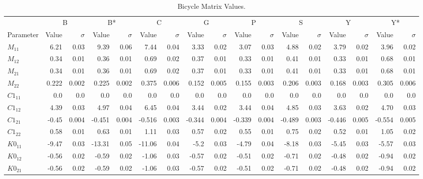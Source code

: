 \documentclass[../report/parameterReport.tex]{subfiles}
\begin{document}
\begin{landscape}
\begin{table}[tb]
\begin{center}
\caption{Bicycle Matrix Values.}
{\small
\begin{tabular}{l|rr|rr|rr|rr|rr|rr|rr|rr}
 & \multicolumn{2}{c}{B} & \multicolumn{2}{c}{B*} & \multicolumn{2}{c}{C} & \multicolumn{2}{c}{G} & \multicolumn{2}{c}{P} & \multicolumn{2}{c}{S} & \multicolumn{2}{c}{Y} & \multicolumn{2}{c}{Y*}\\
Parameter & Value & $\sigma$ & Value & $\sigma$
          & Value & $\sigma$ & Value & $\sigma$
          & Value & $\sigma$ & Value & $\sigma$
          & Value & $\sigma$ & Value & $\sigma$\\
\hline
$M_{11}$ & 6.21 & 0.03 & 9.39 & 0.06 & 7.44 & 0.04 & 3.33 & 0.02 & 3.07 & 0.03 & 4.88 & 0.02 & 3.79 & 0.02 & 3.96 & 0.02\\
$M_{12}$ & 0.34 & 0.01 & 0.36 & 0.01 & 0.69 & 0.02 & 0.37 & 0.01 & 0.33 & 0.01 & 0.41 & 0.01 & 0.33 & 0.01 & 0.68 & 0.01\\
$M_{21}$ & 0.34 & 0.01 & 0.36 & 0.01 & 0.69 & 0.02 & 0.37 & 0.01 & 0.33 & 0.01 & 0.41 & 0.01 & 0.33 & 0.01 & 0.68 & 0.01\\
$M_{22}$ & 0.222 & 0.002 & 0.225 & 0.002 & 0.375 & 0.006 & 0.152 & 0.005 & 0.155 & 0.003 & 0.206 & 0.003 & 0.168 & 0.003 & 0.305 & 0.006\\
$C1_{11}$ & 0.0 & 0.0 & 0.0 & 0.0 & 0.0 & 0.0 & 0.0 & 0.0 & 0.0 & 0.0 & 0.0 & 0.0 & 0.0 & 0.0 & 0.0 & 0.0\\
$C1_{12}$ & 4.39 & 0.03 & 4.97 & 0.04 & 6.45 & 0.04 & 3.44 & 0.02 & 3.44 & 0.04 & 4.85 & 0.03 & 3.63 & 0.02 & 4.70 & 0.03\\
$C1_{21}$ & -0.45 & 0.004 & -0.451 & 0.004 & -0.516 & 0.003 & -0.344 & 0.004 & -0.339 & 0.004 & -0.489 & 0.003 & -0.446 & 0.005 & -0.554 & 0.005\\
$C1_{22}$ & 0.58 & 0.01 & 0.63 & 0.01 & 1.11 & 0.03 & 0.57 & 0.02 & 0.55 & 0.01 & 0.75 & 0.02 & 0.52 & 0.01 & 1.05 & 0.02\\
$K0_{11}$ & -9.47 & 0.03 & -13.31 & 0.05 & -11.06 & 0.04 & -5.2 & 0.03 & -4.79 & 0.04 & -8.18 & 0.03 & -5.45 & 0.03 & -5.57 & 0.03\\
$K0_{12}$ & -0.56 & 0.02 & -0.59 & 0.02 & -1.06 & 0.03 & -0.57 & 0.02 & -0.51 & 0.02 & -0.71 & 0.02 & -0.48 & 0.02 & -0.94 & 0.02\\
$K0_{21}$ & -0.56 & 0.02 & -0.59 & 0.02 & -1.06 & 0.03 & -0.57 & 0.02 & -0.51 & 0.02 & -0.71 & 0.02 & -0.48 & 0.02 & -0.94 & 0.02\\

\end{tabular}}
\end{center}
\end{table}
\end{landscape}
\end{document}
